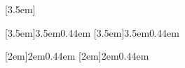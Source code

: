                 [3.5em] %
                {\smallskip} %
                {\normalfont\normalsize\contentslabel[\bfseries\thecontentslabel]{3.5em}\bfseries} %
                {\hspace*{-3.5em}\bfseries} %
                {\bfseries\dotfill\contentspage} %

            [3.5em]{}{3.5em}{0.44em}
            [3.5em]{}{3.5em}{0.44em}

            [2em]{\smallskip}{2em}{0.44em}
            [2em]{\smallskip}{2em}{0.44em}


        \setcounter{tocdepth}{4} %
        \setcounter{secnumdepth}{4} %


        \usepackage[shortlabels]{enumitem} %



    \usepackage{ae} %
    \usepackage[T1]{fontenc} %
    \usepackage[utf8]{inputenc} %

    \usepackage{fontawesome} %



    \usepackage[english, main=brazil]{babel} %

        \AtBeginDocument{\renewcommand{\bibname}{Referências Bibliográficas}}

